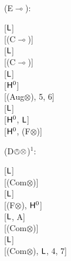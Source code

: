 \documentclass[a4paper,english,fleqn,11pt,final]{scrartcl}
\newcommand{\negg}{{\sim}}
\newcommand{\sfH}{\protect\ensuremath{\mathsf{H}}}
\newcommand{\sfL}{\protect\ensuremath{\mathsf{L}}}
\newcommand{\limp}{\multimap}
\newcommand{\timp}{\rightarrowtriangle}
\newcommand{\tens}{\otimes}
\newcommand{\Deriv}[1]{{\normalfont\textsf{#1}}}
\newcommand{\oland}{\owedge}
\theoremstyle{plain}
\theoremstyle{definition}
\newcommand{\thm}{\text{\scriptsize\; (thm)}}
\begin{document}
{\begin{minipage}[t][][b]{.46\textwidth}
\Deriv{(E$\limp$)}:

\medskip

{
\setlength{\fitchprfwidth}{1.6in}
\fitchprf{
\pline[A ]{\top \limp (\neg \alpha \timp \alpha)}
}
{
	\pline[1 ]{\top \limp \negg\negg(\neg \alpha \timp \alpha)}[$\sfL$]\\
	\pline[2 ]{\negg (\neg \alpha \timp \alpha) \limp \negg \top}[\Deriv{(C$\limp$)}]\\
	\pline[3 ]{\negg (\neg \alpha \timp \alpha) \limp \negg \alpha}[$\sfL$]\\
	\pline[4 ]{\alpha \limp \negg\negg (\neg \alpha \timp \alpha)}[\Deriv{(C$\limp$)}]\\
	\pline[5 ]{\alpha \limp  (\neg \alpha \timp \alpha)}[$\sfL$]\\
	\pline[6 ]{\alpha \tens \neg \alpha \thm}[$\sfH^0$]\\
	\pline[7 ]{\alpha \tens (\neg \alpha \oland (\neg \alpha \timp \alpha))}[\Deriv{(Aug$\tens$)}, 5, 6]\\
	\pline[8 ]{\alpha \tens (\alpha \oland \neg \alpha)}[$\sfL$]\\
	\pline[9 ]{\alpha \tens \bot}[$\sfH^0$, $\sfL$]\\
	\pline[\slider]{\alpha}[$\sfH^0$, \Deriv{(F$\tens$)}]
}
}
\end{minipage}

\bigskip

\begin{minipage}[t][][b]{.43\textwidth}

\Deriv{(D$\oland\tens$)$^1$}:

\medskip

{
\setlength{\fitchprfwidth}{1.15in}
\fitchprf{
\pline[A ]{(\alpha \oland \varphi) \tens (\alpha \oland \psi)}
}
{
	\pline[1 ]{(\alpha \oland \varphi) \tens \alpha}[$\sfL$]\\
	\pline[2 ]{\alpha \tens (\alpha \oland \varphi)}[\Deriv{(Com$\tens$)}]\\
	\pline[3 ]{\alpha \tens \alpha}[$\sfL$]\\
	\pline[4 ]{\alpha}[\Deriv{(F$\tens$)}, $\sfH^0$]\\
	\pline[5 ]{(\alpha \oland \varphi) \tens \psi}[$\sfL$, A]\\
	\pline[6 ]{\psi \tens (\alpha \oland \varphi)}[\Deriv{(Com$\tens$)}]\\
	\pline[7 ]{\psi \tens \varphi}[$\sfL$]\\
	\pline[\slider]{\alpha \oland (\varphi \tens \psi)}[\Deriv{(Com$\tens$)}, $\sfL$, 4, 7]
}
}
\end{minipage}
\begin{minipage}[t][][b]{.46\textwidth}


\end{minipage}}
\end{document}
